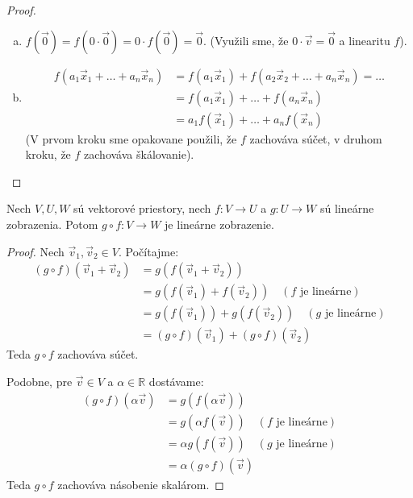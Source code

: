\begin{proof}~
\begin{enumerate}[a)]
    \item $f(\vec{0}) = f(0 \cdot \vec{0}) = 0 \cdot f(\vec{0}) = \vec{0}$. (Využili sme, že $0 \cdot \vec{v} = \vec{0}$ a linearitu $f$).
    \item 
    \begin{align*}
    f(a_1 \vec{x}_1 + \dots + a_n \vec{x}_n) &= f(a_1 \vec{x}_1) + f(a_2 \vec{x}_2 + \dots + a_n \vec{x}_n) = \dots \\
    &= f(a_1 \vec{x}_1) + \dots + f(a_n \vec{x}_n) \\
    &= a_1 f(\vec{x}_1) + \dots + a_n f(\vec{x}_n)
    \end{align*}
    (V prvom kroku sme opakovane použili, že $f$ zachováva súčet, v druhom kroku, že $f$ zachováva škálovanie).
\end{enumerate}
\end{proof}

\begin{veta}\label{veta:zlozenieLZ}
Nech $V, U, W$ sú vektorové priestory, nech $f: V \to U$ a $g: U \to W$ sú lineárne zobrazenia. Potom $g \circ f: V \to W$ je lineárne zobrazenie.
\end{veta}

\begin{proof}
Nech $\vec{v}_1, \vec{v}_2 \in V$. Počítajme:
\begin{align*}
(g \circ f)(\vec{v}_1 + \vec{v}_2) &= g(f(\vec{v}_1 + \vec{v}_2)) \\
&= g(f(\vec{v}_1) + f(\vec{v}_2)) \quad (f \text{ je lineárne}) \\
&= g(f(\vec{v}_1)) + g(f(\vec{v}_2)) \quad (g \text{ je lineárne}) \\
&= (g \circ f)(\vec{v}_1) + (g \circ f)(\vec{v}_2)
\end{align*}
Teda $g \circ f$ zachováva súčet.

Podobne, pre $\vec{v} \in V$ a $\alpha \in \mathbb{R}$ dostávame:
\begin{align*}
(g \circ f)(\alpha \vec{v}) &= g(f(\alpha \vec{v})) \\
&= g(\alpha f(\vec{v})) \quad (f \text{ je lineárne}) \\
&= \alpha g(f(\vec{v})) \quad (g \text{ je lineárne}) \\
&= \alpha (g \circ f)(\vec{v})
\end{align*}
Teda $g \circ f$ zachováva násobenie skalárom.
\end{proof}

